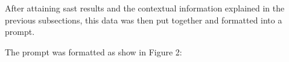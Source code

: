After attaining \ac{sast} results and the contextual information explained in the previous subsections, this data was then put together and formatted into a prompt.

The prompt was formatted as show in Figure 2: